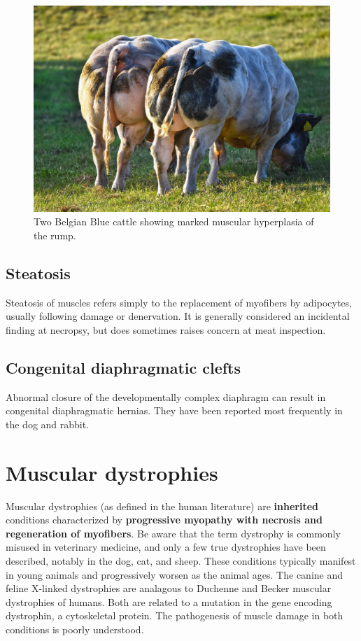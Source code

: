 \documentclass[openany]{report}
\begin{document}
\begin{figure}

{\centering \includegraphics[width=0.6\linewidth]{images/belgian-blue} 

}

\caption{Two Belgian Blue cattle showing marked muscular hyperplasia of the rump.}\label{fig:belgian-blue}
\end{figure}

\subsection{Steatosis}\label{steatosis}

Steatosis of muscles refers simply to the replacement of myofibers by
adipocytes, usually following damage or denervation. It is generally
considered an incidental finding at necropsy, but does sometimes raises
concern at meat inspection.

\subsection{Congenital diaphragmatic
clefts}\label{congenital-diaphragmatic-clefts}

Abnormal closure of the developmentally complex diaphragm can result in
congenital diaphragmatic hernias. They have been reported most
frequently in the dog and rabbit.

\section{Muscular dystrophies}\label{muscular-dystrophies}

Muscular dystrophies (as defined in the human literature) are
\textbf{inherited} conditions characterized by \textbf{progressive
myopathy with necrosis and regeneration of myofibers}. Be aware that the
term dystrophy is commonly misused in veterinary medicine, and only a
few true dystrophies have been described, notably in the dog, cat, and
sheep. These conditions typically manifest in young animals and
progressively worsen as the animal ages. The canine and feline X-linked
dystrophies are analagous to Duchenne and Becker muscular dystrophies of
humans. Both are related to a mutation in the gene encoding dystrophin,
a cytoskeletal protein. The pathogenesis of muscle damage in both
conditions is poorly understood.
\end{document}
